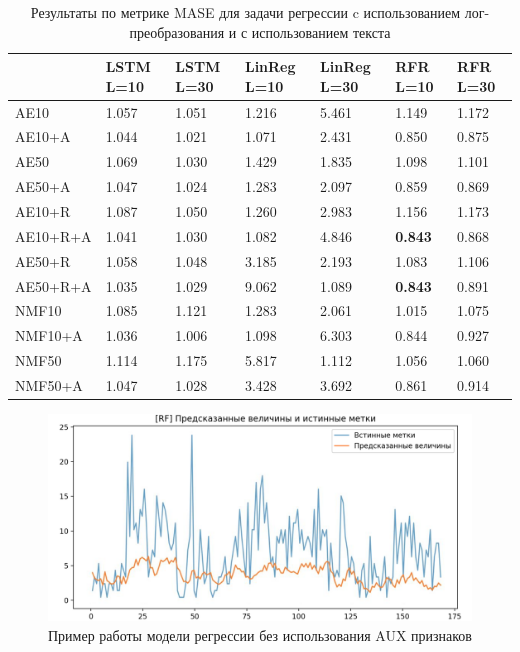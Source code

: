 \begin{center}
\begin{table}
 \begin{tabular}{||p{3.8cm}|p{1.5cm}|p{1.5cm}|p{1.5cm}|p{1.5cm}|p{1.5cm}|p{1.5cm}||} 
\hline
& LSTM L=10 & LSTM L=30 & LinReg L=10 & LinReg L=30 & RFR L=10 & RFR L=30\\ \hline\hline
AE10 & 1.057 & 1.051 & 1.216 & 5.461 & 1.149 & 1.172\\ \hline
AE10+A & 1.044 & 1.021 & 1.071 & 2.431 & 0.850 & 0.875\\ \hline
AE50 & 1.069 & 1.030 & 1.429 & 1.835 & 1.098 & 1.101\\ \hline
AE50+A & 1.047 & 1.024 & 1.283 & 2.097 & 0.859 & 0.869\\ \hline
AE10+R & 1.087 & 1.050 & 1.260 & 2.983 & 1.156 & 1.173\\ \hline
AE10+R+A & 1.041 & 1.030 & 1.082 & 4.846 & \textbf{0.843} & 0.868\\ \hline
AE50+R & 1.058 & 1.048 & 3.185 & 2.193 & 1.083 & 1.106\\ \hline
AE50+R+A & 1.035 & 1.029 & 9.062 & 1.089 & \textbf{0.843} & 0.891\\ \hline
NMF10 & 1.085 & 1.121 & 1.283 & 2.061 & 1.015 & 1.075\\ \hline
NMF10+A & 1.036 & 1.006 & 1.098 & 6.303 & 0.844 & 0.927\\ \hline
NMF50 & 1.114 & 1.175 & 5.817 & 1.112 & 1.056 & 1.060\\ \hline
NMF50+A & 1.047 & 1.028 & 3.428 & 3.692 & 0.861 & 0.914\\ \hline
\end{tabular}
\caption{\label{table:reg-res-log} Результаты по метрике MASE для задачи регрессии c использованием лог-преобразования и с использованием текста}
\end{table}
\end{center}

\begin{figure}
  \includegraphics[width=\linewidth]{images/reg_noaux.png}
  \caption{Пример работы модели регрессии без использования AUX признаков}
  \label{fig:rf_reg_noaux}
\end{figure}

